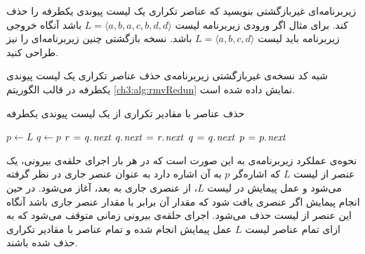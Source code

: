 زیربرنامه‌ای غیربازگشتی بنویسید که عناصر تکراری یک لیست پیوندی یکطرفه را حذف کند. برای مثال اگر ورودی زیربرنامه لیست {$L=\langle a,b,a,c,b,d,d\rangle$} باشد آنگاه خروجی زیربرنامه باید لیست {$L=\langle a,b,c,d\rangle$} باشد. نسخه بازگشتی چنین زیربرنامه‌ای  را نیز طراحی کنید.


شبه کد نسخه‌ی غیربازگشتی زیربرنامه‌ی حذف عناصر تکراری یک لیست پیوندی یکطرفه در قالب الگوریتم {\ref{ch3:alg:rmvRedun}} نمایش داده شده است.
\begin{algorithm}
\caption{حذف عناصر با مقادیر تکراری از یک لیست پیوندی یکطرفه}\label{ch3:alg:rmvRedun}
\begin{latin}
\begin{algorithmic}[1]
				\State	\Return
		\EndIf
		\State	$p \gets L$
				\State	$q \gets p$
								\State	$r \mathrel{\hspace{1pt}=\hspace{1pt}} q.\hspace*{1pt}\mathit{next}$
								\State	$q.\hspace*{1pt}\mathit{next} \mathrel{\hspace{1pt}=\hspace{1pt}} r.\hspace*{1pt}\mathit{next}$
								\State	{}
						\Else
								\State	$q \mathrel{\hspace{1pt}=\hspace{1pt}} q.\hspace*{1pt}\mathit{next}$
						\EndIf
				\EndWhile
				\State	$p \mathrel{\hspace{1pt}=\hspace{1pt}} p.\hspace*{1pt}\mathit{next}$
		\EndWhile		
\EndProcedure
\end{algorithmic}
\end{latin}
\end{algorithm}

نحوه‌ی عملکرد زیربرنامه‌ی {} به این صورت است که در هر بار اجرای حلقه‌ی {} بیرونی، یک عنصر از لیست {$L$} که اشاره‌گر {$p$} به آن اشاره دارد به عنوان عنصر جاری در نظر گرفته می‌شود و عمل پیمایش در لیست {$L$}، از عنصری جاری به بعد، آغاز می‌شود. در حین انجام پیمایش اگر عنصری یافت شود که مقدار آن برابر با مقدار عنصر جاری باشد آنگاه این عنصر از لیست حذف می‌شود. اجرای حلقه‌ی {} بیرونی زمانی متوقف می‌شود که به ازای تمام عناصر لیست {$L$} عمل پیمایش انجام شده و تمام عناصر با مقادیر تکراری حذف شده باشند.

